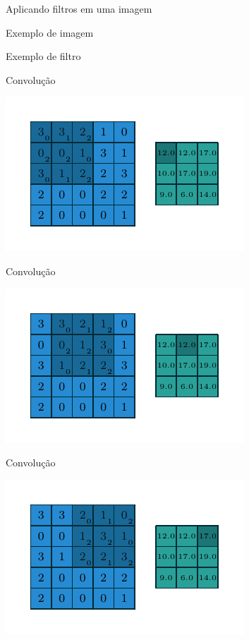 \documentclass[10pt]{beamer}
\begin{document}
\begin{frame}{Aplicando filtros em uma imagem}

\end{frame}


\begin{frame}{Exemplo de imagem}

\end{frame}

\begin{frame}{Exemplo de filtro}

\end{frame}


\begin{frame}{Convolução}
\begin{center}
\includegraphics[scale=1.5]{images/numerical_no_padding_no_strides_00.pdf}
\end{center}
\end{frame}

\begin{frame}{Convolução}
\begin{center}
\includegraphics[scale=1.5]{images/numerical_no_padding_no_strides_01.pdf}
\end{center}
\end{frame}

\begin{frame}{Convolução}
\begin{center}
\includegraphics[scale=1.5]{images/numerical_no_padding_no_strides_02.pdf}
\end{center}
\end{frame}
\end{document}

